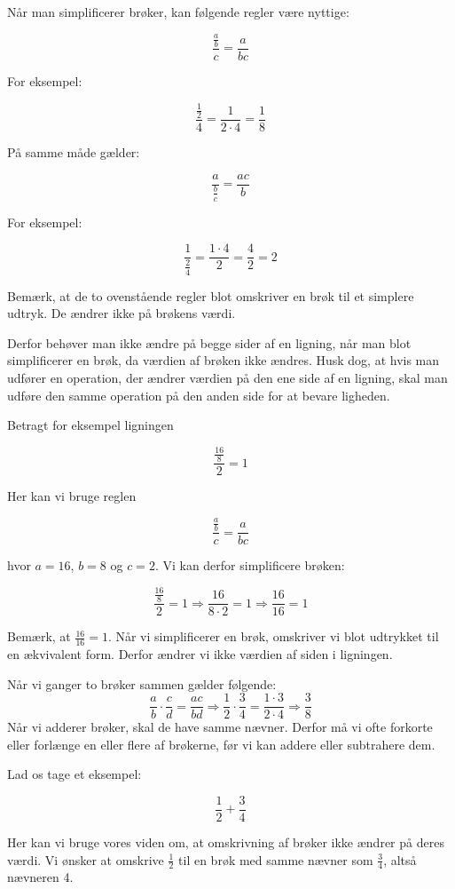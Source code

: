 Når man simplificerer brøker, kan følgende regler være nyttige:

\[
\frac{\frac{a}{b}}{c} = \frac{a}{bc}
\]

For eksempel:

\[
\frac{\frac{1}{2}}{4} = \frac{1}{2\cdot4} = \frac{1}{8}
\]

På samme måde gælder:

\[
\frac{a}{\frac{b}{c}} = \frac{ac}{b}
\]

For eksempel:

\[
\frac{1}{\frac{2}{4}} = \frac{1\cdot4}{2} = \frac{4}{2} = 2
\]

Bemærk, at de to ovenstående regler blot omskriver en brøk til et simplere udtryk. De ændrer ikke på brøkens værdi.

Derfor behøver man ikke ændre på begge sider af en ligning, når man blot simplificerer en brøk, da værdien af brøken ikke ændres. Husk dog, at hvis man udfører en operation, der ændrer værdien på den ene side af en ligning, skal man udføre den samme operation på den anden side for at bevare ligheden.

Betragt for eksempel ligningen

\[
\frac{\frac{16}{8}}{2} = 1
\]

Her kan vi bruge reglen

\[
\frac{\frac{a}{b}}{c} = \frac{a}{bc}
\]

hvor \(a = 16\), \(b = 8\) og \(c = 2\). Vi kan derfor simplificere brøken:

\[
\frac{\frac{16}{8}}{2} = 1
\Rightarrow
\frac{16}{8\cdot2} = 1
\Rightarrow
\frac{16}{16} = 1
\]

Bemærk, at \(\frac{16}{16} = 1\). Når vi simplificerer en brøk, omskriver vi blot udtrykket til en ækvivalent form. Derfor ændrer vi ikke værdien af siden i ligningen.

Når vi ganger to brøker sammen gælder følgende:
\[
\frac{a}{b} \cdot \frac{c}{d} = \frac{ac}{bd} \Rightarrow \frac{1}{2}\cdot\frac{3}{4} = \frac{1\cdot3}{2\cdot4} \Rightarrow \frac{3}{8}
\]
Når vi adderer brøker, skal de have samme nævner. Derfor må vi ofte forkorte eller forlænge en eller flere af brøkerne, før vi kan addere eller subtrahere dem.

Lad os tage et eksempel:

\[
\frac{1}{2} + \frac{3}{4}
\]

Her kan vi bruge vores viden om, at omskrivning af brøker ikke ændrer på deres værdi. Vi ønsker at omskrive $\frac{1}{2}$ til en brøk med samme nævner som $\frac{3}{4}$, altså nævneren 4.

